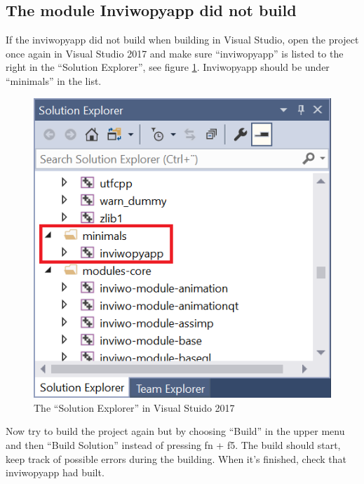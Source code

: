 \subsection{The module Inviwopyapp did not build}

If the inviwopyapp did not build when building in Visual Studio, open the project once again in Visual Studio 2017 and make sure ``inviwopyapp'' is listed to the right in the ``Solution Explorer'', see figure \ref{fig:VisStudioInviwopyapp}. Inviwopyapp should be under ``minimals'' in the list.

\begin{figure}[H]
    \centering
    \includegraphics[scale = 0.6]{images/VisualStudioinviwopyapp.png}
    \caption{The ``Solution Explorer'' in Visual Stuido 2017}
    \label{fig:VisStudioInviwopyapp}
\end{figure}

Now try to build the project again but by choosing ``Build'' in the upper menu and then ``Build Solution'' instead of pressing fn + f5. The build should start, keep track of possible errors during the building. When it's finished, check that inviwopyapp had built.
